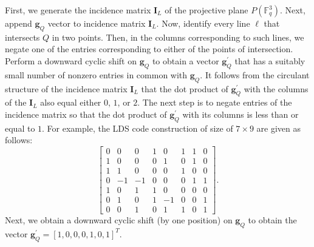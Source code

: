 \documentclass[journal,comsoc]{IEEEtran}
\begin{document}
First, we generate the incidence matrix $\mathbf{I}_L$ of the projective plane $P(\mathbb{F}_q^3)$. Next, append $\mathbf{g}_Q$ vector to incidence matrix $\mathbf{I}_L$. Now, identify every line $\ell$ that intersects $Q$ in two points. Then, in the columns  corresponding to such lines, we negate one of the entries corresponding to either of the points of intersection. \iffalse Note the dot product of any two distinct columns of the resultant matrix is at most $1$.\fi Perform a downward cyclic shift on $\mathbf{g}_Q$ to obtain a vector $\mathbf{g}_Q^{\prime}$ that has a suitably small number of nonzero entries in common with $\mathbf{g}_Q$. It follows from the circulant structure of the incidence matrix $\mathbf{I}_L$ that the dot product of $\mathbf{g}_Q^{\prime}$ with the columns of the $\mathbf{I}_L$ also equal either $0$, $1$, or $2$. The next step is to negate entries of the incidence matrix so that the dot product of $\mathbf{g}_Q^{\prime}$ with its columns is less than or equal to $1$. \iffalse The final step in the process is to normalize the vectors in the resulting matrix.  In this document, we use the procedure described above to construct code matrices that are overloaded by two columns. But, it may be possible to push the procedure even further and construct code matrices that are more overloaded.\fi For example, the LDS code construction of size of $7\times 9$ are given as follows: \iffalse We begin by adjoining $\mathbf{g}_Q$ to the incidence matrix, $\mathbf{I}_L$, of the Fano plane and negating entries of the columns of the Fano plane so that the dot product of any two columns in the resulting matrix is less than or equal to $1$. We thereby obtain the following matrix:\fi
\[ \begin{bmatrix} 0 & 0 & 0 & 1 & 0 & 1 & 1 & 0\\
1 & 0 & 0 & 0 & 1 & 0 & 1 & 0\\
1 & 1 & 0 & 0 & 0 & 1 & 0 & 0\\
0 & -1 & -1 & 0 & 0 & 0 & 1 & 1\\
1 & 0 & 1 & 1 & 0 & 0 & 0 & 0\\
0 & 1 & 0 & 1 & -1 & 0 & 0 & 1\\
0 & 0 & 1 & 0 & 1 & 1 & 0 & 1 \end{bmatrix}. \]
Next, we obtain a downward cyclic shift (by one position) on $\mathbf{g}_Q$ to obtain the vector $\mathbf{g}_Q^{\prime} = [1,0,0,0,1,0,1]^T$. \iffalse
\[I_Q^{\prime} = \begin{bmatrix} 1\\
0\\
0\\
0\\
1\\
0\\
1 \end{bmatrix}. \]\fi
\end{document}
